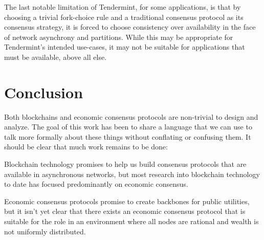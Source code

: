 \documentclass[11pt,a4paper]{article}
\theoremstyle{plain}
\theoremstyle{definition}
\begin{document}
The last notable limitation of Tendermint, for some applications, is that by choosing a trivial fork-choice rule and a traditional consensus protocol as its consensus strategy, it is forced to choose consistency over availability in the face of network asynchrony and partitions. While this may be appropriate for Tendermint's intended use-cases, it may not be suitable for applications that must be available, above all else. 


\section{Conclusion}

Both blockchains and economic consensus protocols are non-trivial to design and analyze. The goal of this work has been to share a language that we can use to talk more formally about these things without conflating or confusing them. It should be clear that much work remains to be done: 

Blockchain technology promises to help us build consensus protocols that are available in asynchronous networks, but most research into blockchain technology to date has focused predominantly on economic consensus.

Economic consensus protocols promise to create backbones for public utilities, but it isn't yet clear that there exists an economic consensus protocol that is suitable for the role in an environment where all nodes are rational and wealth is not uniformly distributed.

\pagebreak



\end{document}
